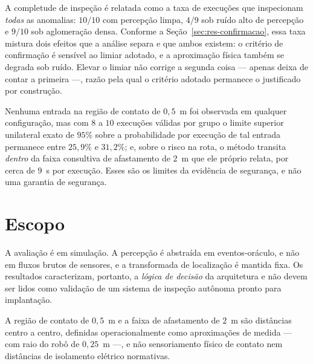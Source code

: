 A completude de inspeção é relatada como a taxa de execuções que inspecionam
\emph{todas} as anomalias: $10/10$ com percepção limpa, $4/9$ sob ruído alto de
percepção e $9/10$ sob aglomeração densa. Conforme a
Seção~\ref{sec:res-confirmacao}, essa taxa mistura dois efeitos que a análise separa e
que ambos existem: o critério de confirmação é sensível ao limiar adotado, e a
aproximação física também se degrada sob ruído. Elevar o limiar não corrige a segunda
coisa --- apenas deixa de contar a primeira ---, razão pela qual o critério adotado
permanece o justificado por construção.

Nenhuma entrada na região de contato de $0{,}5$~m foi observada em qualquer
configuração, mas com $8$ a $10$ execuções válidas por grupo o limite superior
unilateral exato de $95\%$ sobre a probabilidade por execução de tal entrada
permanece entre $25{,}9\%$ e $31{,}2\%$; e, sobre o risco na rota, o método transita
\emph{dentro} da faixa consultiva de afastamento de $2$~m que ele próprio relata, por
cerca de $9$~s por execução. Esses são os limites da evidência de segurança, e não
uma garantia de segurança.

\section{Escopo}
\label{sec:conc-escopo}

A avaliação é em simulação. A percepção é abstraída em eventos-oráculo, e não em
fluxos brutos de sensores, e a transformada de localização é mantida fixa. Os
resultados caracterizam, portanto, a \emph{lógica de decisão} da arquitetura e não
devem ser lidos como validação de um sistema de inspeção autônoma pronto para
implantação.

A região de contato de $0{,}5$~m e a faixa de afastamento de $2$~m são distâncias
centro a centro, definidas operacionalmente como aproximações de medida --- com raio
do robô de $0{,}25$~m ---, e não sensoriamento físico de contato nem distâncias de
isolamento elétrico normativas.

